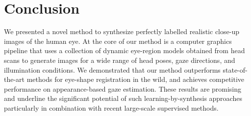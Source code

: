 
\section{Conclusion}


We presented a novel method to synthesize perfectly labelled realistic close-up images of the human eye.
At the core of our method is a computer graphics pipeline that uses a collection of dynamic eye-region models obtained from head scans to generate images for a wide range of head poses, gaze directions, and illumination conditions.
We demonstrated that our method outperforms state-of-the-art methods for eye-shape registration in the wild, and achieves competitive performance on appearance-based gaze estimation.
These results are promising and underline the significant potential of such learning-by-synthesis approaches particularly in combination with recent large-scale supervised methods.